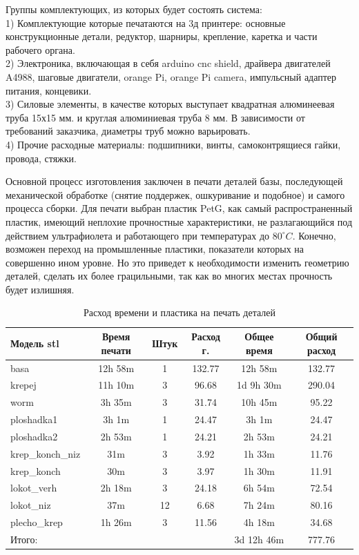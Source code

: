 Группы комплектующих, из которых будет состоять система:\\
1) Комплектующие которые печатаются на 3д принтере: основные конструкционные детали, редуктор, шарниры, крепление, каретка и части рабочего органа.\\
2) Электроника, включающая в себя arduino cnc shield, драйвера двигателей A4988, шаговые двигатели, orange Pi, orange Pi camera, импульсный адаптер питания, концевики.\\
3) Силовые элементы, в качестве которых выступает квадратная алюминеевая труба 15х15 мм. и круглая алюминиевая труба 8 мм. В зависимости от требований заказчика, диаметры труб можно варьировать.\\
4) Прочие расходные материалы: подшипники, винты, самоконтрящиеся гайки, провода, стяжки.

Основной процесс изготовления заключен в печати деталей базы, последующей механической обработке (снятие поддержек, ошкуривание и подобное) и самого процесса сборки. Для печати выбран пластик PetG, как самый распространенный пластик, имеющий неплохие прочностные характеристики, не разлагающийся под действием ультрафиолета и работающего при температурах до $80^{\circ} C$. Конечно, возможен переход на промышленные пластики, показатели которых на совершенно ином уровне. Но это приведет к необходимости изменить геометрию деталей, сделать их более грацильными, так как во многих местах прочность будет излишняя.

\begin{table}[h!]
    \centering
\begin{tabular}{|l|c|c|c|c|c|}
\hline
Модель stl &  Время печати & Штук  & Расход г. & Общее время & Общий расход\\
\hline
basa  &  12h 58m & 1 & 132.77 & 12h 58m & 132.77 \\
\hline
krepej  &  11h 10m & 3 & 96.68 & 1d 9h 30m & 290.04\\
\hline
worm  &  3h 35m & 3 & 31.74 & 10h 45m & 95.22 \\
\hline
ploshadka1  &  3h 1m & 1 & 24.47 & 3h 1m & 24.47\\
\hline
ploshadka2  &  2h 53m & 1 & 24.21 & 2h 53m & 24.21\\
\hline
krep\_konch\_niz  &  31m & 3 & 3.92 & 1h 33m & 11.76\\
\hline
krep\_konch  &  30m & 3 & 3.97 & 1h 30m & 11.91\\
\hline
lokot\_verh  &  2h 18m & 3 & 24.18 & 6h 54m  & 72.54\\
\hline
lokot\_niz  &  37m & 12 & 6.68 & 7h 24m & 80.16\\
\hline
plecho\_krep  & 1h 26m & 3 & 11.56 & 4h 18m & 34.68\\
\hline
Итого:  &  &  &  & 3d 12h 46m & 777.76\\
\hline
\end{tabular}
\caption{Расход времени и пластика на печать деталей}
\end{table}

